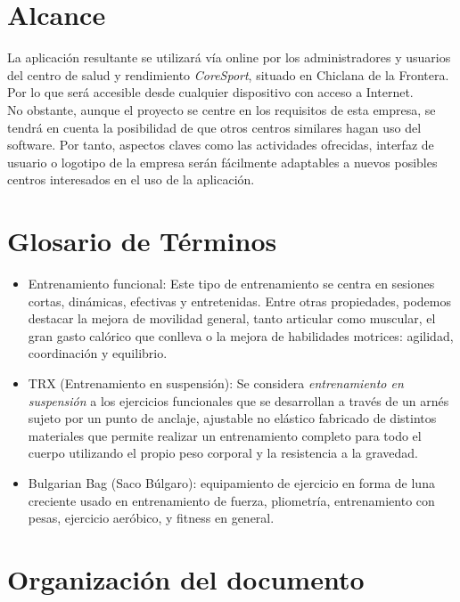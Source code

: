 \section{Alcance} 

La aplicación resultante se utilizará vía online por los administradores y usuarios del centro de salud y rendimiento \textsl{CoreSport}, situado en Chiclana de la Frontera. Por lo que será accesible desde cualquier dispositivo con acceso a Internet. 
\\

No obstante, aunque el proyecto se centre en los requisitos de esta empresa, se tendrá en cuenta la posibilidad de que otros centros similares hagan uso del software. Por tanto, aspectos claves como las actividades ofrecidas, interfaz de usuario o logotipo de la empresa serán fácilmente adaptables a nuevos posibles centros interesados en el uso de la aplicación. 


\section{Glosario de Términos} 

\begin{itemize} 
\item Entrenamiento funcional: Este tipo de entrenamiento se centra en sesiones cortas, dinámicas, efectivas y entretenidas. Entre otras propiedades, podemos destacar la mejora de movilidad general, tanto articular como muscular, el gran gasto calórico que conlleva o la mejora de habilidades motrices: agilidad, coordinación y equilibrio. 
\item TRX (Entrenamiento en suspensión):  Se considera \textsl{entrenamiento en suspensión} a los ejercicios funcionales que se desarrollan a través de un arnés sujeto por un punto de anclaje, ajustable no elástico fabricado de distintos materiales que permite realizar un entrenamiento completo para todo el cuerpo utilizando el propio peso corporal y la resistencia a la gravedad.
\item Bulgarian Bag (Saco Búlgaro): equipamiento de ejercicio en forma de luna creciente usado en entrenamiento de fuerza, pliometría, entrenamiento con pesas, ejercicio aeróbico, y fitness en general.
\end {itemize}


\section{Organización del documento}

